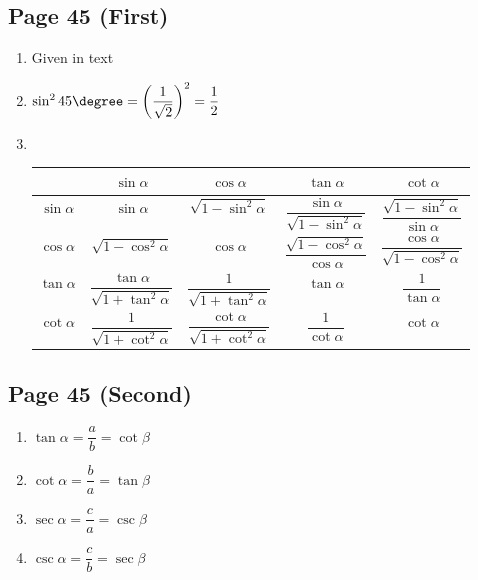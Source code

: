 \documentclass{article}
\newenvironment{solutions}[1]
{\subsection*{#1}
 \begin{enumerate}[leftmargin=1.5em]}
{\end{enumerate}}
\newcommand{\solution}{\item}
\begin{document}
\begin{solutions}{Page 45 (First)}
\solution %
Given in text

\solution %
$\sin^{2}{45\degree} = \left(\dfrac{1}{\sqrt{2}}\right)^2 = \dfrac{1}{2}$

\solution ~ %
\begin{center}
\bgroup
\def\arraystretch{2.1}
\setlength\tabcolsep{15pt}
\begin{tabular}{ |c|c|c|c|c| }
\hline
~              & $\sin{\alpha}$                                      & $\cos{\alpha}$                           & $\tan{\alpha}$                                      & $\cot{\alpha}$ \\
\hline
$\sin{\alpha}$ & $\sin{\alpha}$                                      & $\sqrt{1 - \sin^{2}{\alpha}}$            & $\dfrac{\sin{\alpha}}{\sqrt{1 - \sin^{2}{\alpha}}}$            & $\dfrac{\sqrt{1 - \sin^{2}{\alpha}}}{\sin{\alpha}}$ \\
\hline
$\cos{\alpha}$ & $\sqrt{1 - \cos^{2}{\alpha}}$                       & $\cos{\alpha}$                           & $\dfrac{\sqrt{1 - \cos^{2}{\alpha}}}{\cos{\alpha}}$ & $\dfrac{\cos{\alpha}}{\sqrt{1 - \cos^{2}{\alpha}}}$ \\
\hline
$\tan{\alpha}$ & $\dfrac{\tan{\alpha}}{\sqrt{1 + \tan^{2}{\alpha}}}$ & $\dfrac{1}{\sqrt{1 + \tan^{2}{\alpha}}}$ & $\tan{\alpha}$                                      & $\dfrac{1}{\tan{\alpha}}$ \\
\hline
$\cot{\alpha}$ & $\dfrac{1}{\sqrt{1 + \cot^{2}{\alpha}}}$            & $\dfrac{\cot{\alpha}}{\sqrt{1 + \cot^{2}{\alpha}}}$ & $\dfrac{1}{\cot{\alpha}}$                           & $\cot{\alpha}$ \\
\hline
\end{tabular}
\egroup
\end{center}
\end{solutions}


\begin{solutions}{Page 45 (Second)}
\solution $\tan{\alpha} = \dfrac{a}{b} = \cot{\beta}$
\solution $\cot{\alpha} = \dfrac{b}{a} = \tan{\beta}$
\solution $\sec{\alpha} = \dfrac{c}{a} = \csc{\beta}$
\solution $\csc{\alpha} = \dfrac{c}{b} = \sec{\beta}$
\end{solutions}
\end{document}
